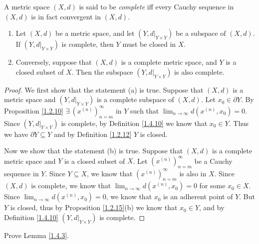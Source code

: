 \begin{definition}\label{1.4.10}
    A metric space \((X, d)\) is said to be \emph{complete} iff every Cauchy sequence in \((X, d)\) is in fact convergent in \((X, d)\).
\end{definition}

\setcounter{theorem}{11}
\begin{proposition}\label{1.4.12}
    \begin{enumerate}
        \item Let \((X, d)\) be a metric space, and let \((Y, d|_{Y \times Y})\) be a subspace of \((X, d)\).
              If \((Y, d|_{Y \times Y})\) is complete, then \(Y\) must be closed in \(X\).
        \item Conversely, suppose that \((X, d)\) is a complete metric space, and \(Y\) is a closed subset of \(X\).
              Then the subspace \((Y, d|_{Y \times Y})\) is also complete.
    \end{enumerate}
\end{proposition}

\begin{proof}
    We first show that the statement (a) is true.
    Suppose that \((X, d)\) is a metric space and \((Y, d|_{Y \times Y})\) is a complete subspace of \((X, d)\).
    Let \(x_0 \in \partial Y\).
    By Proposition \ref{1.2.10} \(\exists\ (x^{(n)})_{n = m}^\infty\) in \(Y\) such that \(\lim_{n \to \infty} d(x^{(n)}, x_0) = 0\).
    Since \((Y, d|_{Y \times Y})\) is complete, by Definition \ref{1.4.10} we know that \(x_0 \in Y\).
    Thus we have \(\partial Y \subseteq Y\) and by Definition \ref{1.2.12} \(Y\) is closed.

    Now we show that the statement (b) is true.
    Suppose that \((X, d)\) is a complete metric space and \(Y\) is a closed subset of \(X\).
    Let \((x^{(n)})_{n = m}^\infty\) be a Cauchy sequence in \(Y\).
    Since \(Y \subseteq X\), we know that \((x^{(n)})_{n = m}^\infty\) is also in \(X\).
    Since \((X, d)\) is complete, we know that \(\lim_{n \to \infty} d(x^{(n)}, x_0) = 0\) for some \(x_0 \in X\).
    Since \(\lim_{n \to \infty} d(x^{(n)}, x_0) = 0\), we know that \(x_0\) is an adherent point of \(Y\).
    But \(Y\) is closed, thus by Proposition \ref{1.2.15}(b) we know that \(x_0 \in Y\), and by Definition \ref{1.4.10} \((Y, d|_{Y \times Y})\) is complete.
\end{proof}

\exercisesection

\begin{exercise}\label{ex 1.4.1}
    Prove Lemma \ref{1.4.3}.
\end{exercise}

